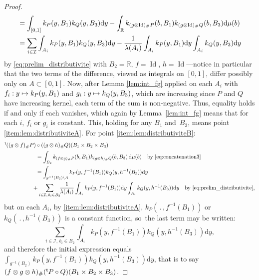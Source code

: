 \documentclass[JEP,XML,SOM,Unicode,NoEqCountersInSection,NoFloatCountersInSection,published]{cedram}
\newcommand\mto{\mathchoice{\longmapsto}{\mapsto}{\mapsto}{\mapsto}}
\theoremstyle{plain}
\theoremstyle{definition}
\newcommand{\dd}{\mathrm{d}}
\newcommand{\Id}{\operatorname{Id}}
\newcommand{\trans}{{}^{\mathrm{t}}\mkern-1mu}
\newcommand{\la}{\lambda}
\newcommand{\R}{\mathbb{R}}
\begin{document}
\begin{proof}
\begin{align*}
&=\int_{[0,1]}k_{P}(y,B_1)k_Q(y,B_3)\dd y-\int_{\R}k_{(g\otimes \Id)_\#P}(b,B_1)k_{(g \otimes {\rm Id})_\#Q}(b,B_3)\dd\mu(b)\\
&=\sum_{i\in\mathcal{I}}\int_{A_i}k_{P}(y,B_1)k_{Q}(y,B_3)\dd y-\frac1{\la(A_i)}\int_{A_i}k_{P}(y,B_1)\dd y\int_{A_i}k_{Q}(y,B_3)\dd y
\end{align*}
by \eqref{eq:prelim_distributivite} with $B_2=\R$, $f=\Id$, $h=\Id$---notice in particular that the two terms of the difference, viewed as integrals on $[0,1]$, differ possibly only on $A\subset[0,1]$. Now, after Lemma \ref{lem:int_fg} applied on each $A_i$ with $f_i:y\mto k_{P}(y,B_1)$ and $g_i:y\mto k_{Q}(y,B_3)$, which are increasing since $P$ and $Q$ have increasing kernel, each term of the sum is non-negative. Thus, equality holds if and only if each vanishes, which again by Lemma~\ref{lem:int_fg} means that for each $i$, $f_i$ or $g_i$ is constant. This, holding for any $B_1$ and~$B_3$, means point \eqref{item:lem:distributiviteA}. For point \eqref{item:lem:distributiviteB}:\vspace*{-3pt}
\begin{align*}
\trans((g\otimes f)_\# P)&\circ ((g \otimes h)_\#Q)(B_1\times B_2\times B_3)\\
&=\int_{B_2} k_{(f\otimes g)_\#P}(b,B_1)k_{(g\otimes h)_\#Q}(b,B_3)\,\dd \mu(b)\quad\text{by \eqref{eq:concatenation3}}\\
&=\int_{g^{-1}(B_2)\setminus A} k_{P}(y,f^{-1}(B_1))k_{Q}(y,h^{-1}(B_3))\dd y\\
&\!\!\!\!+\sum_{i\in \mathcal{I},\,b_i\in B_2}\!\!\frac1{\la(A_i)}\int_{A_i}k_{P}(y,f^{-1}(B_1))\dd y\int_{A_i}k_{Q}(y,h^{-1}(B_3))\dd y\quad\text{by \eqref{eq:prelim_distributivite},}
\end{align*}
but on each $A_i$, by \eqref{item:lem:distributiviteA}, $k_{P}(\,.\,,f^{-1}(B_1))$ or $k_{Q}(\,.\,,h^{-1}(B_3))$ is a constant function, so~the last term may be written:\vspace*{-3pt}
\[\sum_{i\in \mathcal{I},\,b_i\in B_2}\!\int_{A_i}k_{P}(y,f^{-1}(B_1))k_{Q}(y,h^{-1}(B_3))\dd y,\]
and therefore the initial expression equals $\int_{g^{-1}(B_2)} k_{P}(y,f^{-1}(B_1))k_{Q}(y,h^{-1}(B_3))\dd y$, that is to say $(f\otimes g \otimes h)_\#(\trans P\circ Q)(B_1\times B_2\times B_3)$.
\end{proof}
\end{document}
